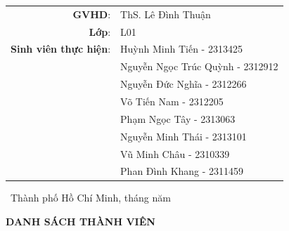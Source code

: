 \documentclass[a4paper]{article} %
\newcommand{\StudentOneName}{Huỳnh Minh Tiến}
\newcommand{\StudentOneID}{2313425}
\newcommand{\StudentTwoName}{Nguyễn Ngọc Trúc Quỳnh}
\newcommand{\StudentTwoID}{2312912}
\newcommand{\StudentThreeName}{Nguyễn Đức Nghĩa}
\newcommand{\StudentThreeID}{2312266}
\newcommand{\StudentFourName}{Võ Tiến Nam}
\newcommand{\StudentFourID}{2312205}
\newcommand{\StudentFiveName}{Phạm Ngọc Tây}
\newcommand{\StudentFiveID}{2313063}
\newcommand{\StudentSixName}{Nguyễn Minh Thái}
\newcommand{\StudentSixID}{2313101}
\newcommand{\StudentSevenName}{Vũ Minh Châu}
\newcommand{\StudentSevenID}{2310339}
\newcommand{\StudentEightName}{Phan Đình Khang}
\newcommand{\StudentEightID}{2311459}
\begin{document}
\begin{titlepage}
    \begin{table}[h]
    \centering
        \begin{tabular}{rl}
        \hspace{3 cm}\textbf{GVHD}:
        & ThS. Lê Đình Thuận\\
        \textbf{Lớp}: & L01\\
        \textbf{Sinh viên thực hiện}: & \StudentOneName{} - \StudentOneID\\
        & \StudentTwoName{} - \StudentTwoID\\
        & \StudentThreeName{} - \StudentThreeID\\
        & \StudentFourName{} - \StudentFourID\\
        & \StudentFiveName{} - \StudentFiveID\\
        & \StudentSixName{} - \StudentSixID\\
        & \StudentSevenName{} - \StudentSevenID\\
        & \StudentEightName{} - \StudentEightID\\
        \end{tabular}
    \end{table}
        \begin{center}
			\fontsize{12pt}{0pt}\selectfont\ Thành phố Hồ Chí Minh, tháng \number\month\space năm \number\year\\
		\end{center}
    \end{titlepage}
    \cleardoublepage

    \begin{center}
        \fontsize{13pt}{0pt}\selectfont \textbf{DANH SÁCH THÀNH VIÊN} \\
        
    \end{center}
    \hspace{-1cm}
\end{document}
